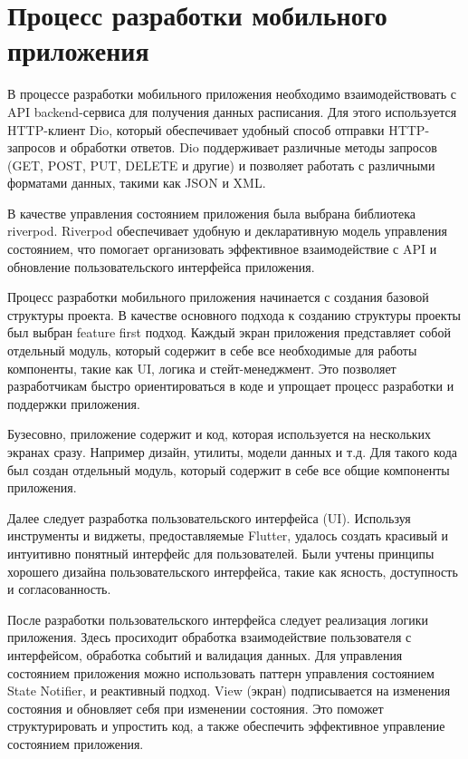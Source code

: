\section{Процесс разработки мобильного приложения}
В процессе разработки мобильного приложения необходимо взаимодействовать с API backend-сервиса для получения данных расписания. 
Для этого используется HTTP-клиент Dio, который обеспечивает удобный способ отправки HTTP-запросов и обработки ответов. 
Dio поддерживает различные методы запросов (GET, POST, PUT, DELETE и другие) и позволяет работать 
с различными форматами данных, такими как JSON и XML.

В качестве управления состоянием приложения была выбрана библиотека riverpod. 
Riverpod обеспечивает удобную и декларативную модель управления состоянием, 
что помогает организовать эффективное взаимодействие с API и обновление пользовательского интерфейса приложения.

Процесс разработки мобильного приложения начинается с создания базовой структуры проекта. 
В качестве основного подхода к созданию структуры проекты был выбран feature first подход.
Каждый экран приложения представляет собой отдельный модуль,
который содержит в себе все необходимые для работы компоненты, такие как UI, логика и стейт-менеджмент.
Это позволяет разработчикам быстро ориентироваться в коде и упрощает процесс разработки и поддержки приложения.

Бузесовно, приложение содержит и код, которая используется на нескольких экранах сразу. Например дизайн, утилиты, модели данных и т.д.
Для такого кода был создан отдельный модуль, который содержит в себе все общие компоненты приложения.

Далее следует разработка пользовательского интерфейса (UI). 
Используя инструменты и виджеты, предоставляемые Flutter, удалось создать красивый 
и интуитивно понятный интерфейс для пользователей. 
Были учтены принципы хорошего дизайна пользовательского интерфейса, 
такие как ясность, доступность и согласованность. 

После разработки пользовательского интерфейса следует реализация логики приложения.
Здесь просиходит обработка взаимодействие пользователя с интерфейсом, обработка событий и валидация данных.
Для управления состоянием приложения можно использовать паттерн управления состоянием State Notifier, и реактивный подход.
View (экран) подписывается на изменения состояния и обновляет себя при изменении состояния.
Это поможет структурировать и упростить код, а также обеспечить эффективное управление состоянием приложения.

